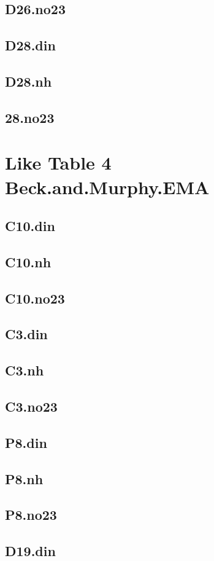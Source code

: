 \documentclass[12pt]{amsart}
\begin{document}
\subsection{D26.no23}
\subsection{D28.din}
\subsection{D28.nh}
\subsection{28.no23}

\section{Like Table 4 Beck.and.Murphy.EMA}
\subsection{C10.din}
\subsection{C10.nh}
\subsection{C10.no23}
\subsection{C3.din}
\subsection{C3.nh}
\subsection{C3.no23}
\subsection{P8.din}
\subsection{P8.nh}
\subsection{P8.no23}
\subsection{D19.din}
\end{document}
